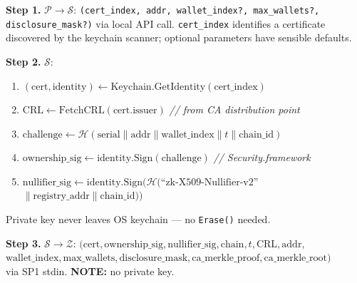 \documentclass[11pt, a4paper]{article}
\begin{document}
\begin{mdframed}[linewidth=0.5pt, innertopmargin=8pt, innerbottommargin=8pt]
\small
\textbf{Step 1.} $\mathcal{P} \rightarrow \mathcal{S}$:
\texttt{(cert\_index, addr, wallet\_index?, max\_wallets?, disclosure\_mask?)} via local API call. \texttt{cert\_index} identifies a certificate discovered by the keychain scanner; optional parameters have sensible defaults.

\medskip
\textbf{Step 2.} $\mathcal{S}$:
\begin{enumerate}[nosep,leftmargin=1.5em]
\item $(\text{cert}, \text{identity}) \leftarrow \text{Keychain.GetIdentity}(\text{cert\_index})$
\item $\text{CRL} \leftarrow \text{FetchCRL}(\text{cert.issuer})$ \hfill\textit{// from CA distribution point}
\item $\text{challenge} \leftarrow \mathcal{H}(\text{serial} \| \text{addr} \| \text{wallet\_index} \| t \| \text{chain\_id})$
\item $\text{ownership\_sig} \leftarrow \text{identity.Sign}(\text{challenge})$ \hfill\textit{// Security.framework}
\item $\text{nullifier\_sig} \leftarrow \text{identity.Sign}(\mathcal{H}(\text{``zk-X509-Nullifier-v2''}$\\
  $\| \text{registry\_addr} \| \text{chain\_id}))$
\end{enumerate}
Private key never leaves OS keychain --- no \texttt{Erase()} needed.

\medskip
\textbf{Step 3.} $\mathcal{S} \rightarrow \mathcal{Z}$:
$(\text{cert}, \text{ownership\_sig}, \text{nullifier\_sig}, \text{chain}, t, \text{CRL}, \text{addr},$\\
$\text{wallet\_index}, \text{max\_wallets}, \text{disclosure\_mask}, \text{ca\_merkle\_proof}, \text{ca\_merkle\_root})$\\
via SP1 stdin. \textbf{NOTE:} no private key.


\end{mdframed}
\end{document}
